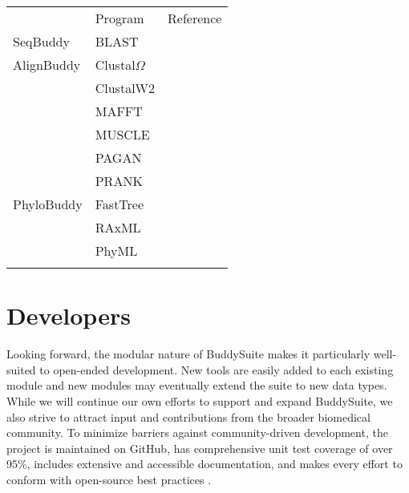 \documentclass[nogrid]{MBE_article}%
\begin{document}
\begin{table}[!t]
      {\tabcolsep=5pt\begin{tabular}{@{\extracolsep{\fill}}lll@{}}
      \toprule
	   						& Program								& Reference
      \\\colrule
      SeqBuddy				& BLAST 								& \cite{Camacho2009}
      \\\colrule
      AlignBuddy			& Clustal$\Omega$						& \cite{Sievers:2011fn} \\
        					& ClustalW2 							& \cite{Larkin:2007hz} \\
							& MAFFT 								& \cite{Katoh:2013hm} \\
							& MUSCLE 								& \cite{Edgar:2004bo} \\
							& PAGAN 								& \cite{Loytynoja:2012fy} \\
        					& PRANK 								& \cite{Loytynoja:2005cb}		
      \\\colrule
      PhyloBuddy			& FastTree								& \cite{Price:2010eg} \\
        					& RAxML 								& \cite{Stamatakis:2006de} \\
        					& PhyML 								& \cite{Guindon:2010gf}
      \\\botrule
      \end{tabular}}
{}
\end{table}

\section{Developers}
Looking forward, the modular nature of BuddySuite makes it particularly well-suited to open-ended development. New tools are easily added to each existing module and new modules may eventually extend the suite to new data types. While we will continue our own efforts to support and expand BuddySuite, we also strive to attract input and contributions from the broader biomedical community. To minimize barriers against community-driven development, the project is maintained on GitHub, has comprehensive unit test coverage of over 95\%, includes extensive and accessible documentation, and makes every effort to conform with open-source best practices \cite{Leprevost:2014gx,Seemann:2013ci}.
\end{document}
